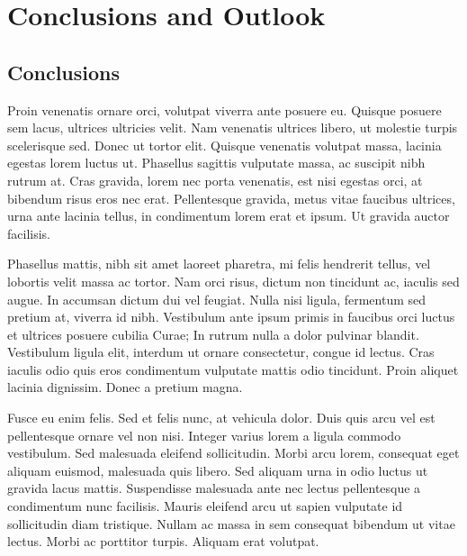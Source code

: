 \section{Conclusions and Outlook}
\label{sec:6}

\vspace{.6cm}
\secttoc
\vspace{.6cm}

\subsection{Conclusions}
Proin venenatis ornare orci, volutpat viverra ante posuere eu. Quisque posuere sem lacus, ultrices ultricies velit. Nam venenatis ultrices libero, ut molestie turpis scelerisque sed. Donec ut tortor elit. Quisque venenatis volutpat massa, lacinia egestas lorem luctus ut. Phasellus sagittis vulputate massa, ac suscipit nibh rutrum at. Cras gravida, lorem nec porta venenatis, est nisi egestas orci, at bibendum risus eros nec erat. Pellentesque gravida, metus vitae faucibus ultrices, urna ante lacinia tellus, in condimentum lorem erat et ipsum. Ut gravida auctor facilisis.

Phasellus mattis, nibh sit amet laoreet pharetra, mi felis hendrerit tellus, vel lobortis velit massa ac tortor. Nam orci risus, dictum non tincidunt ac, iaculis sed augue. In accumsan dictum dui vel feugiat. Nulla nisi ligula, fermentum sed pretium at, viverra id nibh. Vestibulum ante ipsum primis in faucibus orci luctus et ultrices posuere cubilia Curae; In rutrum nulla a dolor pulvinar blandit. Vestibulum ligula elit, interdum ut ornare consectetur, congue id lectus. Cras iaculis odio quis eros condimentum vulputate mattis odio tincidunt. Proin aliquet lacinia dignissim. Donec a pretium magna.

Fusce eu enim felis. Sed et felis nunc, at vehicula dolor. Duis quis arcu vel est pellentesque ornare vel non nisi. Integer varius lorem a ligula commodo vestibulum. Sed malesuada eleifend sollicitudin. Morbi arcu lorem, consequat eget aliquam euismod, malesuada quis libero. Sed aliquam urna in odio luctus ut gravida lacus mattis. Suspendisse malesuada ante nec lectus pellentesque a condimentum nunc facilisis. Mauris eleifend arcu ut sapien vulputate id sollicitudin diam tristique. Nullam ac massa in sem consequat bibendum ut vitae lectus. Morbi ac porttitor turpis. Aliquam erat volutpat.

